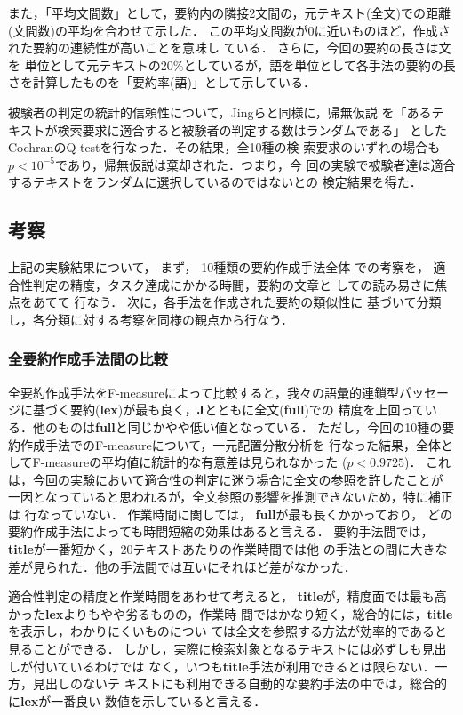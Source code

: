 また，「平均文間数」として，要約内の隣接2文間の，元テキスト(全文)での距離
(文間数)の平均を合わせて示した．
この平均文間数が0に近いものほど，作成された要約の連続性が高いことを意味し
ている．
さらに，今回の要約の長さは文を
単位として元テキストの20\%としているが，語を単位として各手法の要約の長
さを計算したものを「要約率(語)」として示している．

被験者の判定の統計的信頼性について，Jingら\cite{Jing:98}と同様に，帰無仮説
を「あるテキストが検索要求に適合すると被験者の判定する数はランダムである」
としたCochranのQ-test\cite{statistical:81}を行なった．その結果，全10種の検
索要求のいずれの場合も$p<10^{-5}$であり，帰無仮説は棄却された．つまり，今
回の実験で被験者達は適合するテキストをランダムに選択しているのではないとの
検定結果を得た．


\subsection{考察}\label{sec:kousatsu}
上記の実験結果について，
まず，
10種類の要約作成手法全体
での考察を，
適合性判定の精度，タスク達成にかかる時間，要約の文章と
しての読み易さに焦点をあてて
行なう．
次に，各手法を作成された要約の類似性に
基づいて分類し，各分類に対する考察を同様の観点から行なう．


\subsubsection{全要約作成手法間の比較}
全要約作成手法をF-measureによって比較すると，我々の語彙的連鎖型パッセー
ジに基づく要約({\bf lex})が最も良く，{\bf J}とともに全文({\bf full})での
精度を上回っている．他のものは{\bf full}と同じかやや低い値となっている．
ただし，今回の10種の要約作成手法でのF-measureについて，一元配置分散分析を
行なった結果，全体としてF-measureの平均値に統計的な有意差は見られなかった
($p<0.9725$)．
これは，今回の実験において適合性の判定に迷う場合に全文の参照を許したことが
一因となっていると思われるが，全文参照の影響を推測できないため，特に補正は
行なっていない．
作業時間に関しては，
{\bf full}が最も長くかかっており，
どの要約作成手法によっても時間短縮の効果はあると言える．
要約手法間では，{\bf title}が一番短かく，20テキストあたりの作業時間では他
の手法との間に大きな差が見られた．他の手法間では互いにそれほど差がなかった．

適合性判定の精度と作業時間をあわせて考えると，
{\bf title}が，精度面では最も高かった{\bf lex}よりもやや劣るものの，作業時
間ではかなり短く，総合的には，{\bf title}を表示し，わかりにくいものについ
ては全文を参照する方法が効率的であると見ることができる．
しかし，実際に検索対象となるテキストには必ずしも見出しが付いているわけでは
なく，いつも{\bf title}手法が利用できるとは限らない．一方，見出しのないテ
キストにも利用できる自動的な要約手法の中では，総合的に{\bf lex}が一番良い
数値を示していると言える．

